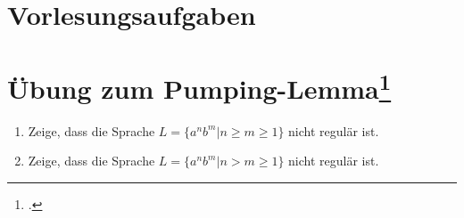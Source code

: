 \documentclass{lehramt-informatik-aufgabe}
\begin{document}
\section{Vorlesungsaufgaben
}

\section{Übung zum Pumping-Lemma\footcite[Seite 65]{theo:fs:1}}

\begin{enumerate}

%

\item Zeige, dass die Sprache $L = \{a^n b^m | n \geq m \geq 1\}$ nicht
regulär ist.

%

\item Zeige, dass die Sprache $L = \{a^n b^m | n > m \geq 1\}$ nicht
regulär ist.
\end{enumerate}
\end{document}
